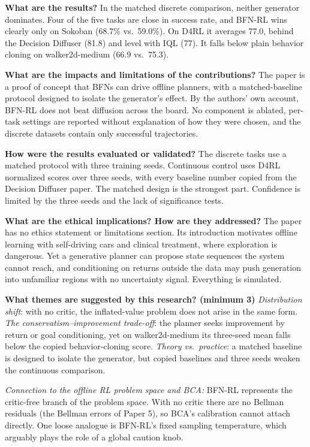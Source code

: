 \documentclass[11pt]{article}
\newcommand{\q}[2]{\item \textbf{#1} #2}
\newcommand{\tiein}[1]{\par\smallskip\noindent\emph{Connection to the offline RL problem space and BCA:} #1\par\medskip}
\begin{document}
\begin{qna}
\q{What are the results?}
In the matched discrete comparison, neither generator dominates. Four of the five tasks are close in success rate, and BFN-RL wins clearly only on Sokoban (68.7\% vs.\ 59.0\%). On D4RL it averages 77.0, behind the Decision Diffuser (81.8) and level with IQL (77). It falls below plain behavior cloning on walker2d-medium (66.9 vs.\ 75.3).

\q{What are the impacts and limitations of the contributions?}
The paper is a proof of concept that BFNs can drive offline planners, with a matched-baseline protocol designed to isolate the generator's effect. By the authors' own account, BFN-RL does not beat diffusion across the board. No component is ablated, per-task settings are reported without explanation of how they were chosen, and the discrete datasets contain only successful trajectories.

\q{How were the results evaluated or validated?}
The discrete tasks use a matched protocol with three training seeds. Continuous control uses D4RL normalized scores over three seeds, with every baseline number copied from the Decision Diffuser paper. The matched design is the strongest part. Confidence is limited by the three seeds and the lack of significance tests.

\q{What are the ethical implications? How are they addressed?}
The paper has no ethics statement or limitations section. Its introduction motivates offline learning with self-driving cars and clinical treatment, where exploration is dangerous. Yet a generative planner can propose state sequences the system cannot reach, and conditioning on returns outside the data may push generation into unfamiliar regions with no uncertainty signal. Everything is simulated.

\q{What themes are suggested by this research? (minimum 3)}
\emph{Distribution shift}: with no critic, the inflated-value problem does not arise in the same form. \emph{The conservatism--improvement trade-off}: the planner seeks improvement by return or goal conditioning, yet on walker2d-medium its three-seed mean falls below the copied behavior-cloning score. \emph{Theory vs.\ practice}: a matched baseline is designed to isolate the generator, but copied baselines and three seeds weaken the continuous comparison.

\end{qna}
\tiein{BFN-RL represents the critic-free branch of the problem space. With no critic there are no Bellman residuals (the Bellman errors of Paper 5), so BCA's calibration cannot attach directly. One loose analogue is BFN-RL's fixed sampling temperature, which arguably plays the role of a global caution knob.}
\end{document}
